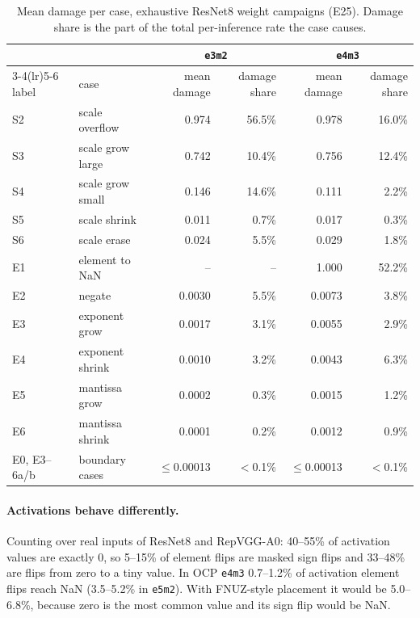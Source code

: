 \documentclass[10pt,a4paper]{article}
\newcommand{\fmt}[1]{\texttt{#1}}
\begin{document}
\begin{table}[h]
\centering
\caption{Mean damage per case, exhaustive ResNet8 weight campaigns (E25). Damage share is the
part of the total per-inference rate the case causes.}
\label{tab:cases}
\begin{tabular}{llrrrr}
\toprule
 & & \multicolumn{2}{c}{\fmt{e3m2}} & \multicolumn{2}{c}{\fmt{e4m3}} \\
\cmidrule(lr){3-4}\cmidrule(lr){5-6}
label & case & mean damage & damage share & mean damage & damage share \\
\midrule
S2 & scale overflow     & 0.974 & 56.5\% & 0.978 & 16.0\% \\
S3 & scale grow large   & 0.742 & 10.4\% & 0.756 & 12.4\% \\
S4 & scale grow small   & 0.146 & 14.6\% & 0.111 & 2.2\% \\
S5 & scale shrink       & 0.011 & 0.7\%  & 0.017 & 0.3\% \\
S6 & scale erase        & 0.024 & 5.5\%  & 0.029 & 1.8\% \\
E1 & element to NaN     & --    & --     & 1.000 & 52.2\% \\
E2 & negate             & 0.0030 & 5.5\% & 0.0073 & 3.8\% \\
E3 & exponent grow      & 0.0017 & 3.1\% & 0.0055 & 2.9\% \\
E4 & exponent shrink    & 0.0010 & 3.2\% & 0.0043 & 6.3\% \\
E5 & mantissa grow      & 0.0002 & 0.3\% & 0.0015 & 1.2\% \\
E6 & mantissa shrink    & 0.0001 & 0.2\% & 0.0012 & 0.9\% \\
E0, E3--6a/b & boundary cases & $\le$0.00013 & $<$0.1\% & $\le$0.00013 & $<$0.1\% \\
\bottomrule
\end{tabular}
\end{table}

\paragraph{Activations behave differently.} Counting over real inputs of ResNet8 and RepVGG-A0:
40--55\% of activation values are exactly 0, so 5--15\% of element flips are masked sign flips
and 33--48\% are flips from zero to a tiny value. In OCP \fmt{e4m3} 0.7--1.2\% of activation
element flips reach NaN (3.5--5.2\% in \fmt{e5m2}). With FNUZ-style placement it would be
5.0--6.8\%, because zero is the most common value and its sign flip would be NaN.
\end{document}

